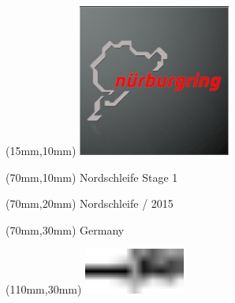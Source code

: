 \null\newpage
\begin{textblock*}{50mm}(15mm,10mm)%
\includegraphics[width=50mm]{LG/2015-05-20_00088.png}
\end{textblock*}
\begin{textblock*}{130mm}(70mm,10mm)%
{\fontsize{20}{20}\selectfont Nordschleife Stage 1}\\
\end{textblock*}
\begin{textblock*}{120mm}(70mm,20mm)%
{\fontsize{16}{16}\selectfont Nordschleife / 2015}\\
\end{textblock*}
\begin{textblock*}{120mm}(70mm,30mm)%
{\fontsize{12}{12}\selectfont Germany}
\end{textblock*}
\begin{textblock*}{30mm}(110mm,30mm)%
\centering
\includegraphics[height=15mm]{icons/tofinish.pdf}
\end{textblock*}
